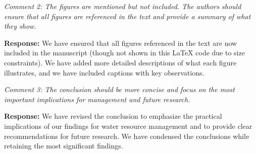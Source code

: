\documentclass[12pt,a4paper]{article}
\begin{document}
\vspace{0.5cm}

\textit{Comment 2: The figures are mentioned but not included. The authors should ensure that all figures are referenced in the text and provide a summary of what they show.}

\textbf{Response:} We have ensured that all figures referenced in the text are now included in the manuscript (though not shown in this LaTeX code due to size constraints). We have added more detailed descriptions of what each figure illustrates, and we have included captions with key observations.

\vspace{0.5cm}

\textit{Comment 3: The conclusion should be more concise and focus on the most important implications for management and future research.}

\textbf{Response:} We have revised the conclusion to emphasize the practical implications of our findings for water resource management and to provide clear recommendations for future research. We have condensed the conclusions while retaining the most significant findings.
\end{document}

